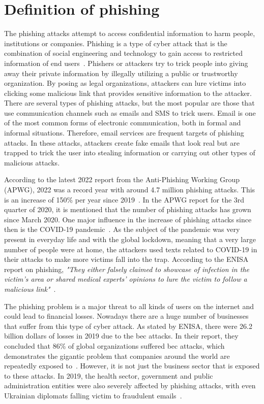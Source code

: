 \section{Definition of phishing}

The phishing attacks attempt to access confidential information to harm people, institutions or companies. Phishing is a type of cyber attack that is the combination of social engineering and technology to gain access to restricted information of end users~\cite{tandale2020different}. Phishers or attackers try to trick people into giving away their private information by illegally utilizing a public or trustworthy organization. By posing as legal organizations, attackers can lure victims into clicking some malicious link that provides sensitive information to the attacker. There are several types of phishing attacks, but the most popular are those that use communication channels such as emails and SMS to trick users.
Email is one of the most common forms of electronic communication, both in formal and informal situations. Therefore, email services are frequent targets of phishing attacks. In these attacks, attackers create fake emails that look real but are trapped to trick the user into stealing information or carrying out other types of malicious attacks.

According to the latest 2022 report from the Anti-Phishing Working Group (APWG), 2022 was a record year with around 4.7 million phishing attacks. This is an increase of 150\% per year since 2019~\cite{apwg4rdquarter2022}. In the APWG report for the 3rd quarter of 2020, it is mentioned that the number of phishing attacks has grown since March 2020. One major influence in the increase of phishing attacks since then is the COVID-19 pandemic~\cite{apwg3rdquarter2020}. As the subject of the pandemic was very present in everyday life and with the global lockdown, meaning that a very large number of people were at home, the attackers used texts related to COVID-19 in their attacks to make more victims fall into the trap. According to the ENISA report on phishing, \textit{"They either falsely claimed to showcase of infection in the victim’s area or shared medical experts’ opinions to lure the victim to follow a malicious link"}~\cite{enisa2020phishing}.


The phishing problem is a major threat to all kinds of users on the internet and could lead to financial losses. Nowadays there are a huge number of businesses that suffer from this type of cyber attack. As stated by ENISA, there were 26.2 billion dollars of losses in 2019 due to the \ac{bec} attacks. In their report, they concluded that 86\% of global organizations suffered \ac{bec} attacks, which demonstrates the gigantic problem that companies around the world are repeatedly exposed to~\cite{enisa2020phishing}. However, it is not just the business sector that is exposed to these attacks. In 2019, the health sector, government and public administration entities were also severely affected by phishing attacks, with even Ukrainian diplomats falling victim to fraudulent emails~\cite{enisa2020phishing}.


